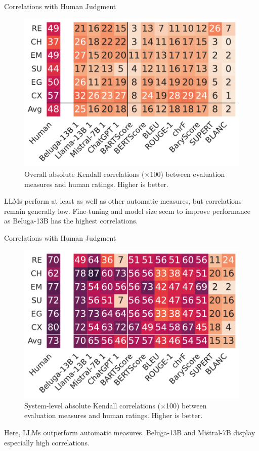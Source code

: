 \begin{frame}{Correlations with Human Judgment}
    \begin{figure}[!h]
    \centering
    \includegraphics[width=0.6\columnwidth]{pictures/llm_mixed1_story_kendall.pdf}
    \caption{Overall absolute Kendall correlations ($\times$100) between evaluation measures and human ratings. Higher is better.}
    \label{fig:story_level_kendall_mixed1_correlations}
    \end{figure}
    \vspace*{-0.3cm}
    LLMs perform at least as well as other automatic measures, but correlations remain generally low. Fine-tuning and model size seem to improve performance as Beluga-13B has the highest correlations.
\end{frame}

\begin{frame}{Correlations with Human Judgment}
    \begin{figure}[!h]
    \centering
    \includegraphics[width=0.6\columnwidth]{pictures/llm_mixed1_w_system_kendall.pdf}
    \caption{System-level absolute Kendall correlations ($\times$100) between evaluation measures and human ratings. Higher is better.}
    \label{fig:system_level_kendall_mixed1_correlations}
    \end{figure}
    \vspace*{-0.3cm}
    Here, LLMs outperform automatic measures. Beluga-13B and Mistral-7B display especially high correlations.
\end{frame}

